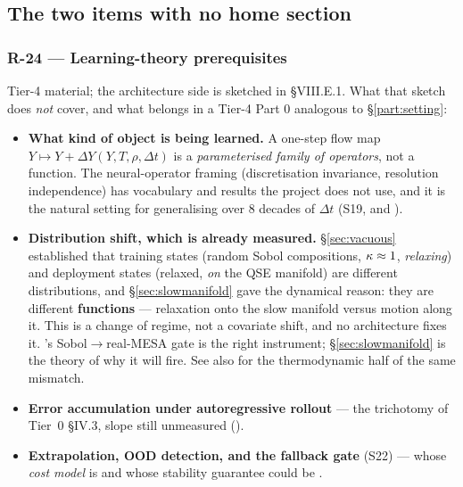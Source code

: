 \subsection{The two items with no home section}
\label{sec:nohome}

\subsubsection{R-24 --- Learning-theory prerequisites}
\label{sec:r24}

Tier-4 material; the architecture side is sketched in 
\S VIII.E.1. What that sketch does \emph{not} cover, and what belongs in a
Tier-4 Part 0 analogous to \S\ref{part:setting}:

\begin{itemize}
\item \textbf{What kind of object is being learned.} A one-step flow map
  $Y \mapsto Y + \Delta Y(Y, T, \rho, \Delta t)$ is a \emph{parameterised family
  of operators}, not a function. The neural-operator framing (discretisation
  invariance, resolution independence) has vocabulary and results the project
  does not use, and it is the natural setting for generalising over 8 decades of
  $\Delta t$ (S19, and ).
\item \textbf{Distribution shift, which is already measured.}
  \S\ref{sec:vacuous} established that training states (random Sobol
  compositions, $\kappa \approx 1$, \emph{relaxing}) and deployment states
  (relaxed, \emph{on} the QSE manifold) are different distributions, and
  \S\ref{sec:slowmanifold} gave the dynamical reason: they are different
  \textbf{functions} --- relaxation onto the slow manifold versus motion along
  it. This is a change of regime, not a covariate shift, and no architecture
  fixes it. 's Sobol$\to$real-MESA gate is the right instrument;
  \S\ref{sec:slowmanifold} is the theory of why it will fire. See also
   for the thermodynamic half of the same mismatch.
\item \textbf{Error accumulation under autoregressive rollout} --- the
  trichotomy of Tier~0 \S IV.3, slope still unmeasured ().
\item \textbf{Extrapolation, OOD detection, and the fallback gate} (S22) ---
  whose \emph{cost model} is  and whose stability guarantee could be
  .
\end{itemize}

